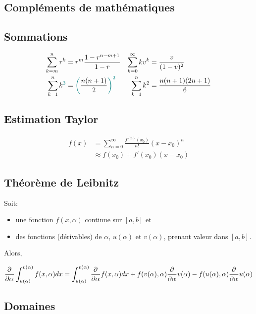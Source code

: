 \documentclass[10pt, french]{article}
\begin{document}
\begin{multicols*}{2}

\section*{Compléments de mathématiques}

\subsection*{Sommations}
\begin{align*}
\sum_{k = m}^{n} r^k &= r^{m} \frac{1 - r^{n - m + 1}}{1 - r} &
\sum_{k = 0}^{\infty}k v^k &= \frac{v}{(1 - v)^2} \\
\sum_{k = 1}^{n}k^{\textcolor{teal}{3}} &= \textcolor{teal}{\bigg(}\frac{n(n + 1)}{2}\textcolor{teal}{\bigg)^{2}} &
\sum_{k = 1}^{n}k^2 &= \frac{n(n + 1)(2n + 1)}{6} \\
\end{align*}

\subsection*{Estimation Taylor}
\begin{align*}
	f(x) 
		&=	\sum_{n = 0}^{\infty} \frac{f^{(n)}(x_0)}{n!}(x - x_0)^{n} \\
		&\approx f(x_0) + f'(x_0) (x - x_0)
\end{align*}

\subsection*{Théorème de Leibnitz}

Soit: 
\begin{itemize}
	\item 	une fonction $f(x, \alpha)$ continue sur $[a, b]$ et
	\item des fonctions (dérivables) de $\alpha$, $u(\alpha)$ et $v(\alpha)$, prenant valeur dans $[a, b]$.
\end{itemize}
Alors,

\begin{equation*}
	\frac{\partial^{}}{\partial \alpha^{}} \int_{u(\alpha)}^{v(\alpha)} f(x, \alpha) dx = 
	\int_{u(\alpha)}^{v(\alpha)} \frac{\partial^{}}{\partial \alpha^{}}  f(x, \alpha) dx + f(v(\alpha), \alpha) \frac{\partial^{}}{\partial \alpha^{}} v(\alpha) - f(u(\alpha), \alpha) \frac{\partial^{}}{\partial \alpha^{}} u(\alpha)
\end{equation*}

\subsection*{Domaines}


\end{multicols*}
\end{document}
